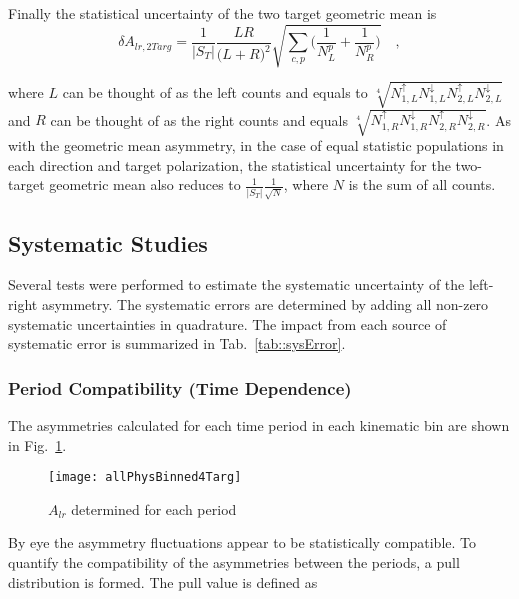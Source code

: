 Finally the statistical uncertainty of the two target geometric mean is
\begin{equation}
  \delta A_{lr,2Targ} = \frac{1}{|S_T|}
  \frac{LR}{\Big( L+R \Big)^2}
  \sqrt{
    \sum_{c,p}
    \Big(
    \frac{1}{N_L^{p}}
    + \frac{1}{N_R^p}
    \Big)
  } \quad,
\end{equation}

\noindent
where $L$ can be thought of as the left counts and equals to
$\sqrt[4]{N_{1,L}^\uparrow N_{1,L}^\downarrow N_{2,L}^\uparrow
  N_{2,L}^\downarrow}$ and $R$ can be thought of as the right counts and equals
$\sqrt[4]{N_{1,R}^\uparrow N_{1,R}^\downarrow N_{2,R}^\uparrow
  N_{2,R}^\downarrow}$.  As with the geometric mean asymmetry, in the case of
equal statistic populations in each direction and target polarization, the
statistical uncertainty for the two-target geometric mean also reduces to
$\frac{1}{|S_T|}\frac{1}{\sqrt{N}}$, where $N$ is the sum of all counts.


\subsection{Systematic Studies} \label{sec::systematics}
Several tests were performed to estimate the systematic uncertainty of the
left-right asymmetry.  The systematic errors are determined by adding all
non-zero systematic uncertainties in quadrature.  The impact from each source of
systematic error is summarized in Tab.~\ref{tab::sysError}.

\subsubsection{Period Compatibility (Time Dependence)}
The asymmetries calculated for each time period in each kinematic bin are shown
in Fig.~\ref{fig::allPhysBinned4Targ}.

\begin{figure}[h!t]
  \begin{center}
    \texttt{[image: allPhysBinned4Targ]}
    \caption{$A_{lr}$ determined for each period}
    \label{fig::allPhysBinned4Targ}
  \end{center}
\end{figure}

\noindent
By eye the asymmetry fluctuations appear to be statistically compatible.  To
quantify the compatibility of the asymmetries between the periods, a pull
distribution is formed.  The pull value is defined as

